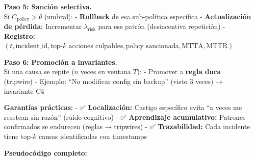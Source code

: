 \textbf{Paso 5: Sanción selectiva.}\\
Si \(C_{\text{policy}} > \theta\) (umbral): - \textbf{Rollback} de esa
sub-política específica - \textbf{Actualización de pérdida:} Incrementar
\(\lambda_{\text{risk}}\) para ese patrón (desincentiva repetición) -
\textbf{Registro:}
\((t, \text{incident\_id}, \text{top-}k \text{ acciones culpables}, \text{policy sancionada}, \text{MTTA}, \text{MTTR})\)

\textbf{Paso 6: Promoción a invariantes.}\\
Si una causa se repite (\(n\) veces en ventana \(T\)): - Promover a
\textbf{regla dura} (tripwire) - Ejemplo: ``No modificar config sin
backup'' (visto 3 veces) → invariante C4

\textbf{Garantías prácticas:} - ✅ \textbf{Localización:} Castigo
específico evita ``a veces me resetean sin razón'' (ruido cognitivo) -
✅ \textbf{Aprendizaje acumulativo:} Patrones confirmados se endurecen
(reglas → tripwires) - ✅ \textbf{Trazabilidad:} Cada incidente tiene
top-\(k\) causas identificadas con timestamps

\textbf{Pseudocódigo completo:}

